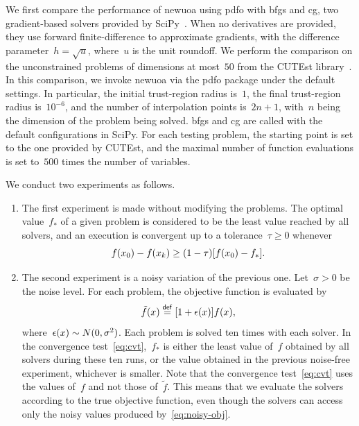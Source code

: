 \documentclass[
    smallextended,  %
    final,        %
]{svjour3}
\newcommand{\eqdef}{\mathrel{\stackrel{\mathsf{def}}{=}}}
\newcommand{\iter}[1][k]{x\ifthenelse{\equal{#1}{}}{}{_{#1}}}
\newcommand{\obj}{f}
\begin{document}
We first compare the performance of \gls{newuoa} using \gls{pdfo} with \gls{bfgs} and \gls{cg}, two gradient-based solvers provided by SciPy~\cite{Virtanen_Etal_2020}.
When no derivatives are provided, they use forward finite-difference to approximate gradients, with the difference parameter~$h = \sqrt{u}$, where~$u$ is the unit roundoff.
We perform the comparison on the unconstrained problems of dimensions at most~$50$ from the CUTEst library~\cite{Gould_Orban_Toint_2015}.
In this comparison, we invoke \gls{newuoa} via the \gls{pdfo} package under the default settings.
In particular, the initial trust-region radius is~$1$, the final trust-region radius is~$10^{-6}$, and the number of interpolation points is~$2n + 1$, with~$n$ being the dimension of the problem being solved.
\Gls{bfgs} and \gls{cg} are called with the default configurations in SciPy.
For each testing problem, the starting point is set to the one provided by CUTEst, and the maximal number of function evaluations is set to~$500$ times the number of variables.

We conduct two experiments as follows.
\begin{enumerate}
    \item The first experiment is made without modifying the problems.
    The optimal value~$\obj_{\ast}$ of a given problem is considered to be the least value reached by all solvers, and an execution is convergent up to a tolerance~$\tau \ge 0$ whenever
    \begin{equation}
        \label{eq:cvt}
        \obj(\iter[0]) - \obj(\iter) \ge (1 - \tau) [\obj(\iter[0]) - \obj_{\ast}].
    \end{equation}
    \item The second experiment is a noisy variation of the previous one.
    Let~$\sigma > 0$ be the noise level.
    For each problem, the objective function is evaluated by
    \begin{equation}
        \label{eq:noisy-obj}
        \tilde{\obj}(\iter[]) \eqdef [1 + \epsilon(\iter[])] \obj(\iter[]),
    \end{equation}
    where~$\epsilon(\iter[]) \sim N(0, \sigma^2)$.
    Each problem is solved ten times with each solver.
    In the convergence test~\eqref{eq:cvt},~$\obj_{\ast}$ is either the least value of~$\obj$ obtained by all solvers during these ten runs, or the value obtained in the previous noise-free experiment, whichever is smaller.
    Note that the convergence test~\eqref{eq:cvt} uses the values of~$\obj$ and not those of~$\tilde{\obj}$.
    This means that we evaluate the solvers according to the true objective function, even though the solvers can access only the noisy values produced by~\eqref{eq:noisy-obj}.
\end{enumerate}
\end{document}
